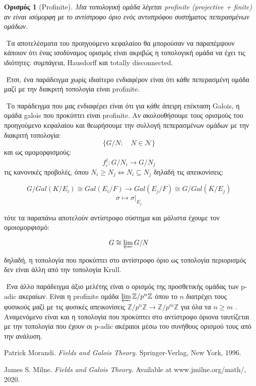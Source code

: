 \documentclass[oneside,a4paper]{article}
\newtheorem*{defn}{Ορισμός}
\newcommand {\tl}{\textlatin}
\begin{document}
\begin{defn}[\tl{Profinite}]Μια τοπολογική ομάδα λέγεται \tl{profinite (projective + finite)} αν είναι ισόμορφη με το αντίστροφο όριο ενός αντιστρόφου συστήματος πεπερασμένων ομάδων. 
\end{defn}

$ $\newline
\noindent Τα αποτελέσματα του προηγούμενο κεφαλαίου θα μπορούσαν να παραπέμψουν κάποιον ότι ένας ισοδύναμος ορισμός είναι ακριβώς η τοπολογική ομάδα να έχει τις ιδιότητες: συμπάγεια, \tl{Hausdorff} και totally disconnected.

$ $\newline
\noindent Έτσι, ένα παράδειγμα χωρίς ιδιαίτερο ενδιαφέρον είναι ότι κάθε πεπερασμένη ομάδα μαζί με την διακριτή τοπολογία είναι \tl{profinite}.

$ $\newline
\noindent Το παράδειγμα που μας ενδιαφέρει είναι ότι για κάθε άπειρη επέκταση Galois, η ομάδα galois που προκύπτει είναι profinite. Αν ακολουθήσουμε τους ορισμούς του προηγούμενο κεφαλαίου και θεωρήσουμε την συλλογή πεπερασμένων ομάδων με την διακριτή τοπολογία:
$$\{G/N: \quad N \in \mathcal{N}\}$$
και ως ομομορφισμούς:
$$f^j_i : G/N_i \longrightarrow G/N_j$$
τις κανονικές προβολές, όπου $N_i \geq N_j \iff N_i \subseteq N_j$
δηλαδή τις απεικονίσεις:

$$G/Gal(K/E_i) \cong Gal(E_i /F) \longrightarrow Gal(E_j /F) \cong G/Gal(K/E_j)$$
$$\sigma \longmapsto \sigma|_{E_j}$$

\noindent τότε τα παραπάνω αποτελούν αντίστροφο σύστημα και μάλιστα έχουμε τον ομοιομορφισμό:

$$G \cong \varprojlim G/N$$

\noindent δηλαδή, η τοπολογία που προκύπτει στο αντίστροφο όριο ως τοπολογία περιορισμός δεν είναι άλλη από την τοπολογία Krull.

$ $\newline
Ένα άλλο παράδειγμα άξιο μελέτης είναι ο ορισμός της προσθετικής ομάδας των p-adic ακεραίων. Είναι η profinite ομάδα $\varprojlim \mathbb{Z}/p^n \mathbb{Z}$ όπου το $n$ διατρέχει τους φυσικούς μαζί με τις φυσικές απεικονίσεις $\mathbb{Z}/p^n \mathbb{Z} \rightarrow \mathbb{Z}/p^m \mathbb{Z}$ για όλα τα $n\geq m$ . Αναμενόμενο είναι και η τοπολογία που προκύπτει στο αντίστροφο όριονα ταυτίζεται με την τοπολογία που έχουν οι p-adic ακέραιοι μέσω του συνήθους ορισμού τους από την ανάλυση.

\pagebreak

\begin{thebibliography}{9}
	\tl{Patrick Morandi.}
	\textit{\tl{Fields and Galois Theory.}}
	\tl{Springer-Verlag, New York, 1996.}

	\tl{James S. Milne.}
	\textit{\tl{Fields and Galois Theory.}}
	\tl{Available at www.jmilne.org/math/, 2020.}
\end{thebibliography}

%
\end{document}
